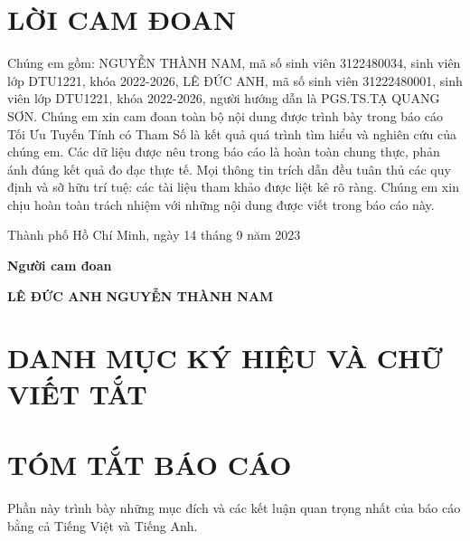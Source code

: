 \documentclass{article} %
\renewcommand{\figurename}{\fontsize{12pt}{0pt}\selectfont \bfseries Hình}
\begin{document}
\section*{LỜI CAM ĐOAN}
\thispagestyle{empty}
Chúng em gồm: NGUYỄN THÀNH NAM, mã số sinh viên 3122480034, sinh viên lớp DTU1221, khóa 2022-2026, LÊ ĐỨC ANH, mã số sinh viên 31222480001, sinh viên lớp DTU1221, khóa 2022-2026, người hướng dẫn là PGS.TS.TẠ QUANG SƠN. Chúng em xin cam đoan toàn bộ nội dung được trình bày trong báo cáo Tối Ưu Tuyến Tính có Tham Số là kết quả quá trình tìm hiểu và nghiên cứu của chúng em. Các dữ liệu được nêu trong báo cáo là hoàn toàn chung thực, phản ánh đúng kết quả đo đạc thực tế. Mọi thông tin trích dẫn đều tuân thủ các quy định và sỡ hữu trí tuệ: các tài liệu tham khảo được liệt kê rõ ràng. Chúng em xin chịu hoàn toàn trách nhiệm với những nội dung được viết trong báo cáo này.

\vspace{6pt}
\hspace{4.5cm}Thành phố Hồ Chí Minh, ngày 14 tháng 9 năm 2023 

\hspace{7.5cm}\textbf{Người cam đoan}

\vspace{2cm}
\hspace{4cm}\textbf{LÊ ĐỨC ANH} \hspace{3.5cm}\textbf{NGUYỄN THÀNH NAM} 
\cleardoublepage

\tableofcontents %
\thispagestyle{empty}
\cleardoublepage

\section*{DANH MỤC KÝ HIỆU VÀ CHỮ VIẾT TẮT}
\cleardoublepage

{\let\oldnumberline\numberline
\renewcommand{\numberline}{\figurename~\oldnumberline}
\listoffigures} %
\cleardoublepage

\listoftables %
\cleardoublepage

\section*{TÓM TẮT BÁO CÁO}
Phần này trình bày những mục đích và các kết luận quan trọng nhất của báo cáo bằng cả Tiếng Việt và Tiếng Anh. 
\cleardoublepage
 
\end{document}

